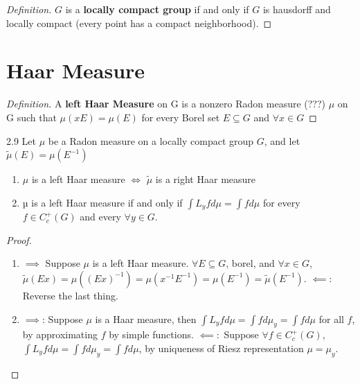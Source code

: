 \documentclass{article}
\newcommand*{\subeq}{\subseteq}
\newenvironment{definition}
{\renewcommand\qedsymbol{$\blacksquare$}\begin{proof}[Definition]}
{\end{proof}}
\begin{document}
\bigskip

\begin{definition}
    $G$ is a \textbf{locally compact group} if and only if $G$ is hausdorff and locally compact (every point has a compact neighborhood).   
\end{definition}

\bigskip
\section*{Haar Measure}

\begin{definition}
    A \textbf{left Haar Measure} on G is a nonzero Radon measure (???) $\mu$ on G such that $\mu(xE) = \mu(E)$ for every Borel set $E \subeq G$ and $\forall x \in G$    
\end{definition}

\begin{claim}{2.9}\label{Claim 2.9.}
    Let $\mu$ be a Radon measure on a locally compact group $G$, and let $\tilde{\mu}(E) = \mu(E^{-1})$
    \begin{enumerate}
        \item $\mu$ is a left Haar measure $\iff$ $\tilde{\mu}$ is a right Haar measure  
        \item  µ is a left Haar measure if and only if $\int L_y f d \mu = \int f d \mu$  for every
        $f \in C^+_c(G)$ and every $\forall y \in G$.
    \end{enumerate}
\end{claim}
\begin{proof}
    \begin{enumerate}
        \item $\implies$ Suppose $\mu$ is a left Haar measure. $\forall E \subeq G$, borel, and $\forall x \in G$, $\tilde{\mu}(Ex) = \mu((Ex)^{-1}) = \mu(x^{-1}E^{-1}) = \mu(E^{-1}) = \tilde{\mu}(E^{-1})$.
        $\impliedby$: Reverse the last thing.   
        \item $\implies$: Suppose $\mu$ is a Haar measure, then $\int L_y f d \mu = \int f d \mu_y = \int f d \mu$ for all $f$, by approximating $f$ by simple functions. 
        $\impliedby:$ Suppose $\forall f \in C_c^+(G)$, $\int L_y f d \mu = \int f d \mu_y = \int f d \mu$, by uniqueness of Riesz representation $\mu = \mu_y$.            
    \end{enumerate}
      
\end{proof}

\bigskip
\end{document}
